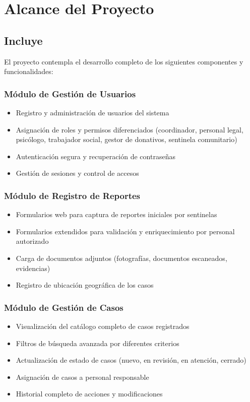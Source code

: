 \documentclass[12pt,letterpaper]{article}
\begin{document}
\newpage

\section{Alcance del Proyecto}

\subsection{Incluye}

El proyecto contempla el desarrollo completo de los siguientes componentes y funcionalidades:

\subsubsection{Módulo de Gestión de Usuarios}
\begin{itemize}
    \item Registro y administración de usuarios del sistema
    \item Asignación de roles y permisos diferenciados (coordinador, personal legal, psicólogo, trabajador social, gestor de donativos, sentinela comunitario)
    \item Autenticación segura y recuperación de contraseñas
    \item Gestión de sesiones y control de accesos
\end{itemize}

\subsubsection{Módulo de Registro de Reportes}
\begin{itemize}
    \item Formularios web para captura de reportes iniciales por sentinelas
    \item Formularios extendidos para validación y enriquecimiento por personal autorizado
    \item Carga de documentos adjuntos (fotografías, documentos escaneados, evidencias)
    \item Registro de ubicación geográfica de los casos
\end{itemize}

\subsubsection{Módulo de Gestión de Casos}
\begin{itemize}
    \item Visualización del catálogo completo de casos registrados
    \item Filtros de búsqueda avanzada por diferentes criterios
    \item Actualización de estado de casos (nuevo, en revisión, en atención, cerrado)
    \item Asignación de casos a personal responsable
    \item Historial completo de acciones y modificaciones
\end{itemize}
\end{document}
